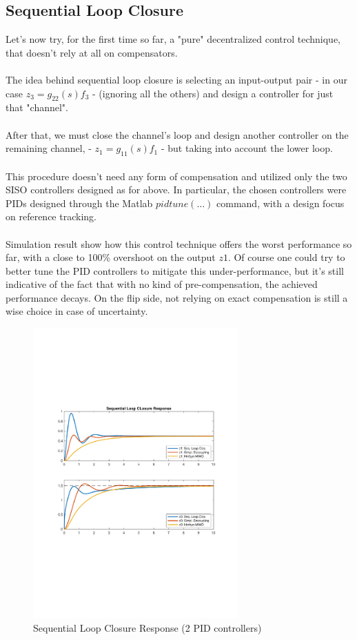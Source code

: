 \documentclass[a4paper, 12pt]{article}
\def\FigureThirteen{\centering\includegraphics[width=0.7\textwidth]{Figures/fig13.pdf}}
\begin{document}
\subsection{Sequential Loop Closure}
Let's now try, for the first time so far, a "pure" decentralized control technique, that doesn't rely at all on compensators.
\\\\
The idea behind sequential loop closure is selecting an input-output pair - in our case $z_3 = g_{22}(s)f_3$ - (ignoring all the others) and design a controller for just that "channel". 
\\\\
After that, we must close the channel's loop and design another controller on the remaining channel, - $z_1 = g_{11}(s)f_1$ - but taking into account the lower loop. 
\\\\
This procedure doesn't need any form of compensation and utilized only the two SISO controllers designed as for above. In particular, the chosen controllers were PIDs designed through the Matlab $pidtune(\dots)$ command, with a design focus on reference tracking.
\\\\
Simulation result show how this control technique offers the worst performance so far, with a close to 100\% overshoot on the output $z1$. Of course one could try to better tune the PID controllers to mitigate this under-performance, but it's still indicative of the fact that with no kind of pre-compensation, the achieved performance decays. On the flip side, not relying on exact compensation is still a wise choice in case of uncertainty.
\begin{figure}[h!]
    \FigureThirteen
    \caption{Sequential Loop Closure Response (2 PID controllers)}
    \label{fig:fig12}
\end{figure}

\clearpage
\end{document}
